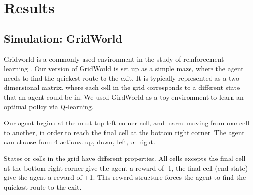 \section{Results}
\subsection{Simulation: GridWorld}

Gridworld is a commonly used environment in the study of reinforcement learning \cite{RL}. Our version of GridWorld is set up as a simple maze, where the agent needs to find the quickest route to the exit.
It is typically represented as a two-dimensional matrix, where each cell in the grid corresponds to a different state that an agent could be in. We used GirdWorld as a toy environment to learn an optimal policy via Q-learning.

Our agent begins at the most top left corner cell, and learns moving from one cell to another, in order to reach the final cell at the bottom right corner. The agent can choose from 4 actions: up, down, left, or right.

States or cells in the grid  have different properties. All cells excepts the final cell at the bottom right corner give the agent a reward of -1, the final cell (end state) give the agent a reward of +1. This reward structure forces  the agent  to find the quickest route to the exit.

